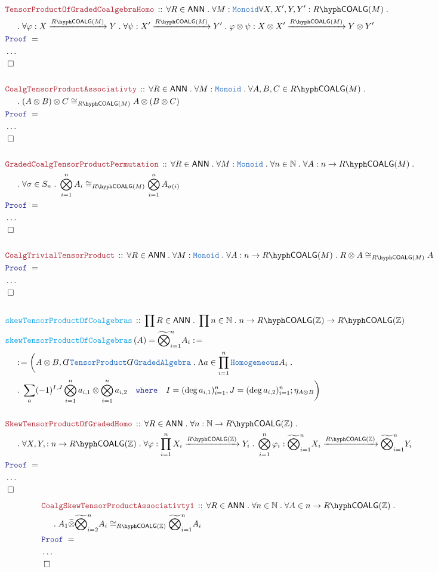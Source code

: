 \documentclass[12pt]{scrartcl}%
\newcommand{\TYPE}[1]{\textcolor{NavyBlue}{\mathtt{#1}}}%
\newcommand{\FUNC}[1]{\textcolor{Cerulean}{\mathtt{#1}}}%
\newcommand{\LOGIC}[1]{\textcolor{Blue}{\mathtt{#1}}}%
\newcommand{\THM}[1]{\textcolor{Maroon}{\mathtt{#1}}}%
\renewcommand{\.}{\; . \;} %
\newcommand{\de}{: \kern 0.1pc =} %
\newcommand{\where}{\LOGIC{where}} %
\newcommand{\Act}[1]{\left( #1 \right)} %
\newcommand{\Theorem}[2]{& \THM{#1} \, :: \, #2 \\ & \Proof = \\ } %
\newcommand{\DeclareFunc}[2]{& \FUNC{#1} \, :: \, #2 \\}%
\newcommand{\DefineNamedFunc}[4]{&  \FUNC{#1}\Act{#2} = #3 \de #4 \\}%
\newcommand{\NewLine}{\\ & \kern 1pc}%
\newcommand{\Page}[1]{ \begin{align*} #1 \end{align*}  }%
\newcommand{ \bd }{ \ByDef }%
\newcommand{\NoProof}{ & \ldots \\ \EndProof}%
\newcommand{\Int}{\mathbb{Z}}%
\newcommand{\Nat}{\mathbb{N}}%
\newcommand{\QED}{\; \square} %
\newcommand{\EndProof}{& \QED \\} %
\newcommand{\ByDef}{\rotatebox[origin=c]{-180}{$D$}}%
\newcommand{\Proof}{\LOGIC{Proof} \; } %
\newcommand{\Arrow}[1]{\xrightarrow{#1}}%
\newcommand{\ANN}{\mathsf{ANN}} %
\newcommand{\COALG}[1]{#1\hyph\mathsf{COALG}}%
\begin{document}
\Page{
	\Theorem{TensorProductOfGradedCoalgebraHomo}
	{
		\forall R \in \ANN \.
		\forall M : \TYPE{Monoid}
		\forall X, X', Y, Y' : \COALG{R}(M) \. \NewLine \. 
		\forall \varphi : X \Arrow{\COALG{R}(M)} Y \. 
		\forall \psi : X' \Arrow{\COALG{R}(M)} Y' \. 
		\varphi \otimes \psi : X \otimes X' \Arrow{\COALG{R}(M)} Y \otimes Y' 
	}
	\NoProof
	\\
	\Theorem{CoalgTensorProductAssociativty}{
		\forall R \in \ANN \.
		\forall M : \TYPE{Monoid} \.
		\forall A,B,C \in \COALG{R}(M) \. 
		\NewLine \. (A \otimes B) \otimes C \cong_{\COALG{R}(M)} A \otimes (B \otimes C)}
	\NoProof
	\\
	\Theorem{GradedCoalgTensorProductPermutation}{
		\forall R \in \ANN \. 
		\forall M : \TYPE{Monoid} \.
		\forall n \in \Nat \. 
		\forall A : n \to  \COALG{R}(M) \.  \NewLine \. 
		\forall \sigma \in S_n \. 
		\bigotimes^n_{i=1} A_i \cong_{\COALG{R}(M)} \bigotimes^n_{i=1} A_{\sigma(i)} 
	}
	\NoProof
	\\
	\Theorem{CoalgTrivialTensorProduct}{
		\forall R \in \ANN \. 
		\forall M : \TYPE{Monoid} \.
		\forall A : n \to \COALG{R}(M) \. 
		R \otimes A \cong_{\COALG{R}(M)} A
	}
	\NoProof
	\\
	\DeclareFunc{skewTensorProductOfCoalgebras}
	{
		\prod R \in \ANN \. 
		\prod n \in \Nat \.
		n \to \COALG{R}(\Int) \to \COALG{R}(\Int) 
	}
	\DefineNamedFunc{skewTensorProductOfCoalgebras}
	{
		A
	}
	{
		\widetilde{\bigotimes}^n_{i=1} A_i
	}
	{
		\NewLine \de
		\bigg( A \otimes B ,  
		\bd \TYPE{TensorProduct } \bd \TYPE{GradedAlgebra}   \. \Lambda a \in \prod^n_{i=1}\TYPE{Homogeneous} A_i \. \NewLine \.  
			 \sum_a (-1)^{I,J} \bigotimes^n_{i=1} a_{i,1} \otimes  \bigotimes^n_{i=1} a_{i,2} 
			 \quad \where \quad I = (\deg a_{i,1})^n_{i=1}, J = (\deg a_{i,2})^n_{i=1}
		;\eta_{A \otimes B}  \bigg)
	}
	\\
	\Theorem{SkewTensorProductOfGradedHomo}
	{
		\forall R \in \ANN \.
		\forall n : \Nat \to \COALG{R}(\Int) \. \NewLine \. 
		\forall X, Y, : n \to  \COALG{R}(\Int) \.  
		\forall \varphi : \prod^n_{i=1} X_i \Arrow{\COALG{R}(\Int)} Y_i \. 
		\bigotimes^n_{i=1} \varphi_i :\widetilde{\bigotimes}^n_{i=1} X_i  \Arrow{\COALG{R}(\Int)} \widetilde{\bigotimes}^n_{i=1} Y_i 
	}
	\NoProof
}\Page{
	\Theorem{CoalgSkewTensorProductAssociativty1}{
		\forall R \in \ANN \.
		\forall n \in \Nat \.
		\forall A \in n \to \COALG{R}(\Int) \. 
		\NewLine \. A_1 \widetilde{\otimes} \widetilde{\bigotimes}^{n}_{i=2} A_i \cong_{\COALG{R}(\Int)} \widetilde{\bigotimes}^n_{i=1} A_i}
	\NoProof	
	\\
}
\end{document}
